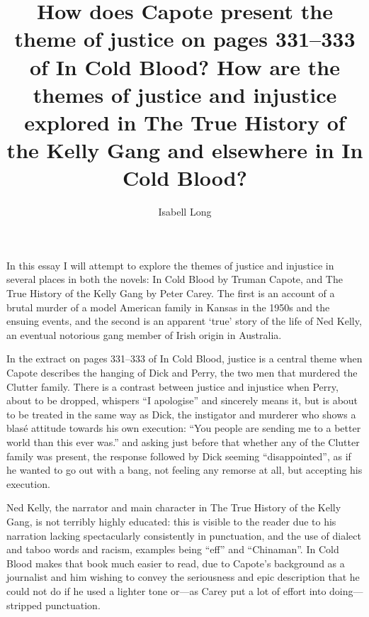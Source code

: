 \documentclass[12pt,a4paper]{article}
\begin{document}
\title{How does Capote present the theme of justice on pages 331--333 of In
Cold Blood?  How are the themes of justice and injustice explored in The
True History of the Kelly Gang and elsewhere in In Cold Blood?}
\author{Isabell Long}
\maketitle

In this essay I will attempt to explore the themes of justice and injustice
in several places in both the novels: In Cold Blood by Truman Capote, and
The True History of the Kelly Gang by Peter Carey.  The first is an account
of a brutal murder of a model American family in Kansas in the 1950s and
the ensuing events, and the second is an apparent `true' story of the life
of Ned Kelly, an eventual notorious gang member of Irish origin in
Australia.

In the extract on pages 331--333 of In Cold Blood, justice is a central
theme when Capote describes the hanging of Dick and Perry, the two men that
murdered the Clutter family.  There is a contrast between justice and
injustice when Perry, about to be dropped, whispers ``I apologise'' and
sincerely means it, but is about to be treated in the same way as Dick, the
instigator and murderer who shows a blas\'e attitude towards his own
execution: ``You people are sending me to a better world
than this ever was.'' and asking just before that whether any of the
Clutter family was present, the response followed by Dick seeming
``disappointed'', as if he wanted to go out with a bang, not feeling any
remorse at all, but accepting his execution.

Ned Kelly, the narrator and main character in The True History of the Kelly
Gang, is not terribly highly educated: this is visible to the reader
due to his narration lacking spectacularly consistently in punctuation, and
the use of dialect and taboo words and racism, examples being ``eff'' and
``Chinaman''.  In Cold Blood makes that book much easier to read, due to
Capote's background as a journalist and him wishing to convey the
seriousness and epic description that he could not do if he used a lighter
tone or---as Carey put a lot of effort into doing---stripped punctuation.
\end{document}

